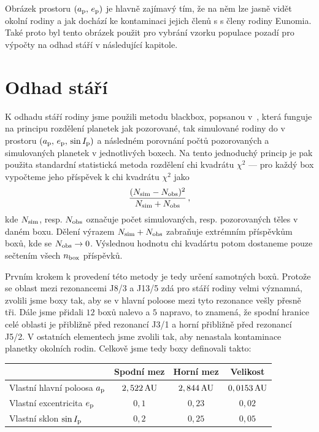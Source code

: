 \documentclass[A4paper, 12pt, oneside]{book}
\begin{document}
Obrázek prostoru $(a_{\rm p},\,e_{\rm p})$ je hlavně zajímavý tím, že na něm lze jasně vidět okolní rodiny a jak dochází ke kontaminaci jejich členů s s členy rodiny Eunomia. Také proto byl tento obrázek použit pro vybrání vzorku populace pozadí pro výpočty na odhad stáří v následující kapitole.

\section{Odhad stáří}

K odhadu stáří rodiny jsme použili metodu blackbox, popsanou v~\cite{broz19}, která funguje na principu rozdělení planetek jak pozorované, tak simulované rodiny do  v prostoru $(a_{\rm p},\,e_{\rm p},\,\sin I_{\rm p})$ a následném porovnání počtů pozorovaných a simulovaných planetek v jednotlivých boxech. Na tento jednoduchý princip je pak použita standardní statistická metoda rozdělení chi kvadrátu $\chi^2$ --- pro každý box vypočteme jeho příspěvek k chi kvadrátu $\chi^2$ jako
\begin{align}
	\frac{(N_{\rm sim}-N_{\rm obs})^2}{N_{\rm sim}+N_{\rm obs}}\,,
\end{align}
kde $N_{\rm sim}$, resp. $N_{\rm obs}$ označuje počet simulovaných, resp. pozorovaných těles v daném boxu. Dělení výrazem $N_{\rm sim}+N_{\rm obs}$ zabraňuje extrémním příspěvkům boxů, kde se $N_{\rm obs}\rightarrow 0$. Výslednou hodnotu chi kvadártu potom dostaneme pouze sečtením všech $n_{\rm box}$ příspěvků.

Prvním krokem k provedení této metody je tedy určení samotných boxů. Protože se oblast mezi rezonancemi J8/3 a J13/5 zdá pro stáří rodiny velmi významná, zvolili jsme boxy tak, aby se v hlavní poloose mezi tyto rezonance vešly přesně tři. Dále jsme přidali $12$ boxů nalevo a $5$ napravo, to znamená, že spodní hranice celé oblasti je přibližně před rezonancí J3/1 a horní přibližně před rezonancí J5/2. V ostatních elementech jsme zvolili tak, aby nenastala kontaminace planetky okolních rodin. Celkově jsme tedy boxy definovali takto:


\begin{center}
\begin{tabularx}{0.8\textwidth}{|X||c|c|c|}
	\hline
	& Spodní mez & Horní mez & Velikost  \\
	\hline \hline
	Vlastní hlavní poloosa $a_{\rm p}$ & $2,522\,{\rm AU}$ & $2,844\,{\rm AU}$ & $0,0153\,{\rm AU}$ \\
	\hline
	Vlastní excentricita $e_{\rm p}$ & $0,1$ & $0,23$ & $0,02$ \\
	\hline
	Vlastní sklon $\sin I_{\rm p}$ & $0,2$ & $0,25$ & $0,05$ \\
	\hline
\end{tabularx}
\end{center}
\end{document}
